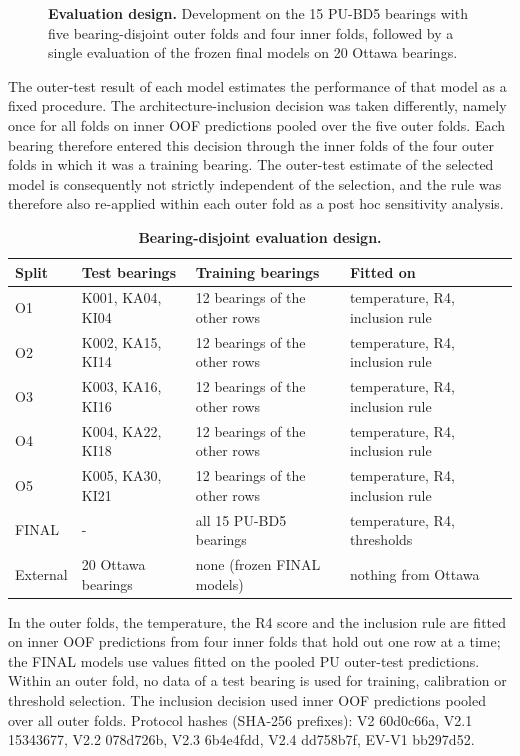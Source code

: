 \documentclass[10pt,letterpaper]{article}
\begin{document}
\begin{figure}[!h]
\caption{\textbf{Evaluation design.} Development on the 15 PU-BD5 bearings with five bearing-disjoint outer folds and four inner folds, followed by a single evaluation of the frozen final models on 20 Ottawa bearings.}
\label{fig1}
\end{figure}

The outer-test result of each model estimates the performance of that model as a fixed procedure. The architecture-inclusion decision was taken differently, namely once for all folds on inner OOF predictions pooled over the five outer folds. Each bearing therefore entered this decision through the inner folds of the four outer folds in which it was a training bearing. The outer-test estimate of the selected model is consequently not strictly independent of the selection, and the rule was therefore also re-applied within each outer fold as a post hoc sensitivity analysis.

\begin{table}[!ht]
\centering
\caption{\textbf{Bearing-disjoint evaluation design.}}
{\footnotesize
\setlength{\tabcolsep}{4pt}
\renewcommand{\arraystretch}{1.25}
\begin{tabular}{llll}
\hline
Split & Test bearings & Training bearings & Fitted on \\
\hline
O1 & K001, KA04, KI04 & 12 bearings of the other rows & temperature, R4, inclusion rule \\
O2 & K002, KA15, KI14 & 12 bearings of the other rows & temperature, R4, inclusion rule \\
O3 & K003, KA16, KI16 & 12 bearings of the other rows & temperature, R4, inclusion rule \\
O4 & K004, KA22, KI18 & 12 bearings of the other rows & temperature, R4, inclusion rule \\
O5 & K005, KA30, KI21 & 12 bearings of the other rows & temperature, R4, inclusion rule \\
FINAL & - & all 15 PU-BD5 bearings & temperature, R4, thresholds \\
External & 20 Ottawa bearings & none (frozen FINAL models) & nothing from Ottawa \\
\hline
\end{tabular}}
\begin{flushleft} In the outer folds, the temperature, the R4 score and the inclusion rule are fitted on inner OOF predictions from four inner folds that hold out one row at a time; the FINAL models use values fitted on the pooled PU outer-test predictions. Within an outer fold, no data of a test bearing is used for training, calibration or threshold selection. The inclusion decision used inner OOF predictions pooled over all outer folds. Protocol hashes (SHA-256 prefixes): V2 60d0c66a, V2.1 15343677, V2.2 078d726b, V2.3 6b4e4fdd, V2.4 dd758b7f, EV-V1 bb297d52. \end{flushleft}
\label{tab:splits}
\end{table}
\end{document}
